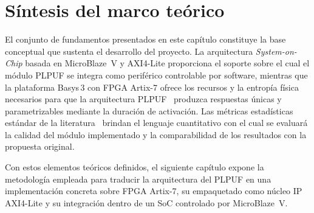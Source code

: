 \section{Síntesis del marco teórico}
\label{sec:teoria_sintesis}

El conjunto de fundamentos presentados en este capítulo constituye la base
conceptual que sustenta el desarrollo del proyecto. La arquitectura
\textit{System-on-Chip} basada en MicroBlaze~V y AXI4-Lite proporciona el
soporte sobre el cual el módulo PLPUF se integra como periférico controlable
por software, mientras que la plataforma Basys\,3 con FPGA Artix-7 ofrece
los recursos y la entropía física necesarios para que la arquitectura
PLPUF~\cite{hori_2011_pseudolfsr} produzca respuestas únicas y
parametrizables mediante la duración de activación. Las métricas estadísticas
estándar de la literatura~\cite{maiti_2012_systematic, wilde_2020_confidence,
frisch_2023_practical} brindan el lenguaje cuantitativo con el cual se
evaluará la calidad del módulo implementado y la comparabilidad de los
resultados con la propuesta original.

Con estos elementos teóricos definidos, el siguiente capítulo expone la
metodología empleada para traducir la arquitectura del PLPUF en una
implementación concreta sobre FPGA Artix-7, su empaquetado como núcleo IP
AXI4-Lite y su integración dentro de un SoC controlado por MicroBlaze~V.

